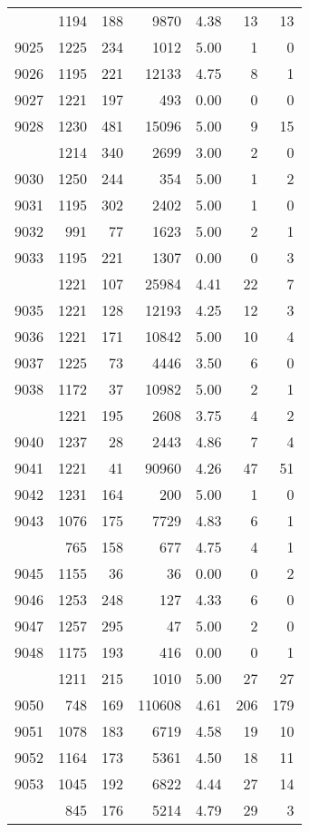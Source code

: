 \documentclass[
]{article}
\begin{document}
\begin{table}
\begin{tabular}[t]{lrrrrrr}
\addlinespace
9024 & 1194 & 188 & 9870 & 4.38 & 13 & 13\\
9025 & 1225 & 234 & 1012 & 5.00 & 1 & 0\\
9026 & 1195 & 221 & 12133 & 4.75 & 8 & 1\\
9027 & 1221 & 197 & 493 & 0.00 & 0 & 0\\
9028 & 1230 & 481 & 15096 & 5.00 & 9 & 15\\
\addlinespace
9029 & 1214 & 340 & 2699 & 3.00 & 2 & 0\\
9030 & 1250 & 244 & 354 & 5.00 & 1 & 2\\
9031 & 1195 & 302 & 2402 & 5.00 & 1 & 0\\
9032 & 991 & 77 & 1623 & 5.00 & 2 & 1\\
9033 & 1195 & 221 & 1307 & 0.00 & 0 & 3\\
\addlinespace
9034 & 1221 & 107 & 25984 & 4.41 & 22 & 7\\
9035 & 1221 & 128 & 12193 & 4.25 & 12 & 3\\
9036 & 1221 & 171 & 10842 & 5.00 & 10 & 4\\
9037 & 1225 & 73 & 4446 & 3.50 & 6 & 0\\
9038 & 1172 & 37 & 10982 & 5.00 & 2 & 1\\
\addlinespace
9039 & 1221 & 195 & 2608 & 3.75 & 4 & 2\\
9040 & 1237 & 28 & 2443 & 4.86 & 7 & 4\\
9041 & 1221 & 41 & 90960 & 4.26 & 47 & 51\\
9042 & 1231 & 164 & 200 & 5.00 & 1 & 0\\
9043 & 1076 & 175 & 7729 & 4.83 & 6 & 1\\
\addlinespace
9044 & 765 & 158 & 677 & 4.75 & 4 & 1\\
9045 & 1155 & 36 & 36 & 0.00 & 0 & 2\\
9046 & 1253 & 248 & 127 & 4.33 & 6 & 0\\
9047 & 1257 & 295 & 47 & 5.00 & 2 & 0\\
9048 & 1175 & 193 & 416 & 0.00 & 0 & 1\\
\addlinespace
9049 & 1211 & 215 & 1010 & 5.00 & 27 & 27\\
9050 & 748 & 169 & 110608 & 4.61 & 206 & 179\\
9051 & 1078 & 183 & 6719 & 4.58 & 19 & 10\\
9052 & 1164 & 173 & 5361 & 4.50 & 18 & 11\\
9053 & 1045 & 192 & 6822 & 4.44 & 27 & 14\\
\addlinespace
9054 & 845 & 176 & 5214 & 4.79 & 29 & 3\\

\end{tabular}
\end{table}
\end{document}
